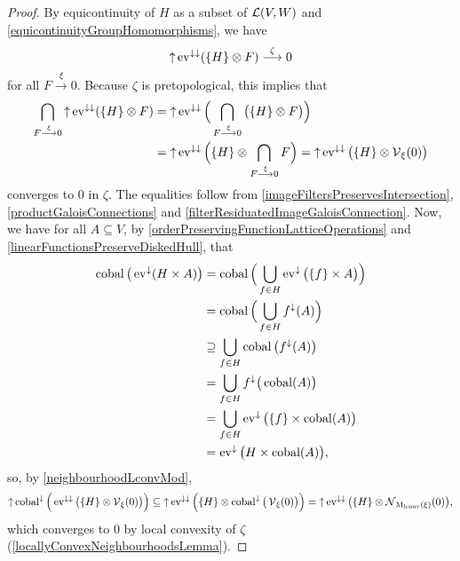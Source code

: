 \begin{proof}
By equicontinuity of $H$ as a subset of $\operatorname{\mathcal{L}}(V,W)$ and \ref{equicontinuityGroupHomomorphisms}, we have
\[ \operatorname{\uparrow} \operatorname{ev}^{\downarrow\downarrow}(\{H\}\otimes F) \overset{\zeta}{\longrightarrow} 0 \]
for all $F\overset{\xi}{\longrightarrow} 0$. Because $\zeta$ is pretopological, this implies that
\begin{align*}
\bigcap_{F\overset{\xi}{\longrightarrow} 0}\operatorname{\uparrow} \operatorname{ev}^{\downarrow\downarrow}(\{H\}\otimes F) &= \operatorname{\uparrow} \operatorname{ev}^{\downarrow\downarrow}\Big(\bigcap_{F\overset{\xi}{\longrightarrow} 0}\big(\{H\}\otimes F\big)\Big) \\
&= \operatorname{\uparrow}\operatorname{ev}^{\downarrow\downarrow}\Big(\{H\}\otimes \bigcap_{F\overset{\xi}{\longrightarrow} 0} F\Big) = \operatorname{\uparrow}\operatorname{ev}^{\downarrow\downarrow}\big(\{H\}\otimes \operatorname{\mathcal{V}}_\xi(0)\big)
\end{align*}
converges to $0$ in $\zeta$. The equalities follow from \ref{imageFiltersPreservesIntersection}, \ref{productGaloisConnections} and \ref{filterResiduatedImageGaloisConnection}.
Now, we have for all $A\subseteq V$, by \ref{orderPreservingFunctionLatticeOperations} and \ref{linearFunctionsPreserveDiskedHull}, that
\begin{align*}
\operatorname{cobal}\big(\operatorname{ev}^{\downarrow}(H\times A)\big) &= \operatorname{cobal}\Big(\bigcup_{f\in H}\operatorname{ev}^{\downarrow}\big(\{f\}\times A\big)\Big) \\
&= \operatorname{cobal}\Big(\bigcup_{f\in H}f^\downarrow(A)\Big) \\
&\supseteq \bigcup_{f\in H}\operatorname{cobal}\big(f^\downarrow(A)\big) \\
&= \bigcup_{f\in H}f^\downarrow\big(\operatorname{cobal}(A)\big) \\
&= \bigcup_{f\in H}\operatorname{ev}^\downarrow\big(\{f\}\times \operatorname{cobal}(A)\big) \\
&= \operatorname{ev}^{\downarrow}\big(H\times \operatorname{cobal}(A)\big),
\end{align*}
so, by \ref{neighbourhoodLconvMod},
\[ \operatorname{\uparrow}\operatorname{cobal}^\downarrow\Big(\operatorname{ev}^{\downarrow\downarrow}\big(\{H\}\otimes \operatorname{\mathcal{V}}_\xi(0)\big)\Big) \subseteq \operatorname{\uparrow} \operatorname{ev}^{\downarrow\downarrow}\Big(\{H\}\otimes \operatorname{cobal}^{\downarrow}\big(\operatorname{\mathcal{V}}_\xi(0)\big)\Big) = \operatorname{\uparrow} \operatorname{ev}^{\downarrow\downarrow}\big(\{H\}\otimes \operatorname{\mathcal{N}}_{\operatorname{M_\text{lconv}}(\xi)}(0)\big), \]
which converges to $0$ by local convexity of $\zeta$ (\ref{locallyConvexNeighbourhoodsLemma}).
\end{proof}

